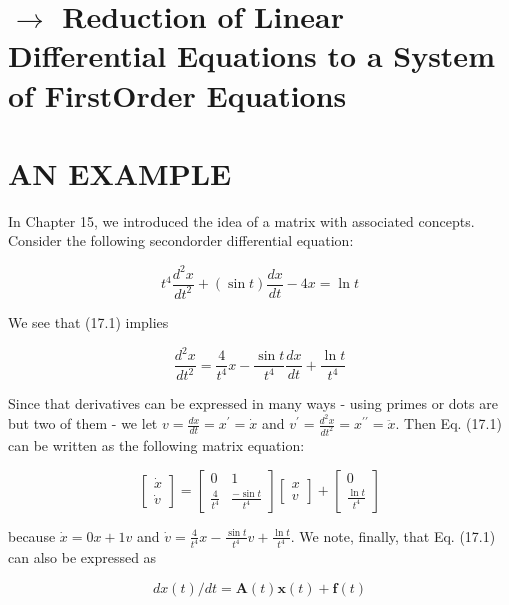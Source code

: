 \documentclass[10pt]{article}
\begin{document}
\section*{$\rightarrow$ Reduction of Linear Differential Equations to a System of FirstOrder Equations}
\section*{AN EXAMPLE}
In Chapter 15, we introduced the idea of a matrix with associated concepts. Consider the following secondorder differential equation:


\begin{equation*}
t^{4} \frac{d^{2} x}{d t^{2}}+(\sin t) \frac{d x}{d t}-4 x=\ln t \tag{17.1}
\end{equation*}


We see that (17.1) implies


\begin{equation*}
\frac{d^{2} x}{d t^{2}}=\frac{4}{t^{4}} x-\frac{\sin t}{t^{4}} \frac{d x}{d t}+\frac{\ln t}{t^{4}} \tag{17.2}
\end{equation*}


Since that derivatives can be expressed in many ways - using primes or dots are but two of them - we let $v=\frac{d x}{d t}=x^{\prime}=\dot{x}$ and $v^{\prime}=\frac{d^{2} x}{d t^{2}}=x^{\prime \prime}=\ddot{x}$. Then Eq. (17.1) can be written as the following matrix equation:

\[
\left[\begin{array}{c}
\dot{x}  \tag{17.3}\\
\dot{v}
\end{array}\right]=\left[\begin{array}{cc}
0 & 1 \\
\frac{4}{t^{4}} & \frac{-\sin t}{t^{4}}
\end{array}\right]\left[\begin{array}{l}
x \\
v
\end{array}\right]+\left[\begin{array}{c}
0 \\
\frac{\ln t}{t^{4}}
\end{array}\right]
\]

because $\dot{x}=0 x+1 v$ and $\dot{v}=\frac{4}{t^{4}} x-\frac{\sin t}{t^{4}} v+\frac{\ln t}{t^{4}}$. We note, finally, that Eq. (17.1) can also be expressed as


\begin{equation*}
d x(t) / d t=\mathbf{A}(t) \mathbf{x}(t)+\mathbf{f}(t) \tag{17.4}
\end{equation*}
\end{document}

